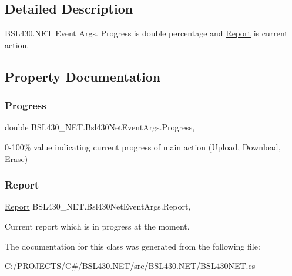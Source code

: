 \subsection{Detailed Description}
B\+S\+L430.\+N\+ET Event Args. Progress is double percentage and \mbox{\hyperlink{class_b_s_l430___n_e_t_1_1_report}{Report}} is current action. 



\subsection{Property Documentation}
\mbox{\label{class_b_s_l430___n_e_t_1_1_bsl430_net_event_args_ae22881015ffeb55141c097bc95add7fe}} 
\subsubsection{\texorpdfstring{Progress}{Progress}}
{\footnotesize\ttfamily double B\+S\+L430\+\_\+\+N\+E\+T.\+Bsl430\+Net\+Event\+Args.\+Progress\hspace{0.3cm}{\ttfamily [get]}, {\ttfamily [set]}}



0-\/100\% value indicating current progress of main action (Upload, Download, Erase) 

\mbox{\label{class_b_s_l430___n_e_t_1_1_bsl430_net_event_args_a82b43c90f3c74a8ebfe93a98559fcf92}} 
\subsubsection{\texorpdfstring{Report}{Report}}
{\footnotesize\ttfamily \mbox{\hyperlink{class_b_s_l430___n_e_t_1_1_report}{Report}} B\+S\+L430\+\_\+\+N\+E\+T.\+Bsl430\+Net\+Event\+Args.\+Report\hspace{0.3cm}{\ttfamily [get]}, {\ttfamily [set]}}



Current report which is in progress at the moment. 



The documentation for this class was generated from the following file\+:\begin{DoxyCompactItemize}
\item 
C\+:/\+P\+R\+O\+J\+E\+C\+T\+S/\+C\#/\+B\+S\+L430.\+N\+E\+T/src/\+B\+S\+L430.\+N\+E\+T/B\+S\+L430\+N\+E\+T.\+cs\end{DoxyCompactItemize}
